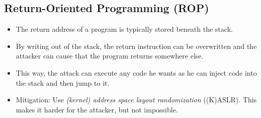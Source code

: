 		\subsection{Return-Oriented Programming (ROP)}
			\begin{itemize}
				\item The return address of a program is typically stored beneath the stack.
				\item By writing out of the stack, the return instruction can be overwritten and the attacker can cause that the program returns somewhere else.
				\item This way, the attack can execute any code he wants as he can inject code into the stack and then jump to it.
				\item Mitigation: Use \textit{(kernel) address space layout randomization} ((K)ASLR). This makes it harder for the attacker, but not impossible.
			\end{itemize}
